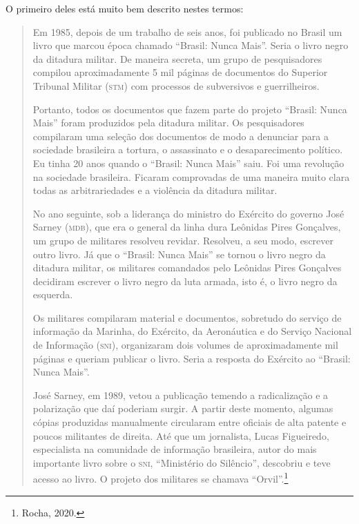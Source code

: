 O primeiro deles está muito bem descrito nestes termos:

\begin{quote}
Em 1985, depois de um trabalho de seis anos, foi publicado no Brasil um
livro que marcou época chamado ``Brasil: Nunca Mais''. Seria o livro
negro da ditadura militar. De maneira secreta, um grupo de pesquisadores
compilou aproximadamente 5 mil páginas de documentos do Superior
Tribunal Militar (\textsc{stm}) com processos de subversivos e guerrilheiros.

Portanto, todos os documentos que fazem parte do projeto ``Brasil: Nunca
Mais'' foram produzidos pela ditadura militar. Os pesquisadores
compilaram uma seleção dos documentos de modo a denunciar para a
sociedade brasileira a tortura, o assassinato e o desaparecimento
político. Eu tinha 20 anos quando o ``Brasil: Nunca Mais'' saiu. Foi uma
revolução na sociedade brasileira. Ficaram comprovadas de uma maneira
muito clara todas as arbitrariedades e a violência da ditadura militar.

No ano seguinte, sob a liderança do ministro do Exército do governo José
Sarney (\textsc{mdb}), que era o general da linha dura Leônidas Pires Gonçalves,
um grupo de militares resolveu revidar. Resolveu, a seu modo, escrever
outro livro. Já que o ``Brasil: Nunca Mais'' se tornou o livro negro da
ditadura militar, os militares comandados pelo Leônidas Pires Gonçalves
decidiram escrever o livro negro da luta armada, isto é, o livro negro
da esquerda.

Os militares compilaram material e documentos, sobretudo do serviço de
informação da Marinha, do Exército, da Aeronáutica e do Serviço Nacional
de Informação (\textsc{sni}), organizaram dois volumes de aproximadamente mil
páginas e queriam publicar o livro. Seria a resposta do Exército ao
``Brasil: Nunca Mais''.

José Sarney, em 1989, vetou a publicação temendo a radicalização e a
polarização que daí poderiam surgir. A partir deste momento, algumas
cópias produzidas manualmente circularam entre oficiais de alta patente
e poucos militantes de direita. Até que um jornalista, Lucas Figueiredo,
especialista na comunidade de informação brasileira, autor do mais
importante livro sobre o \textsc{sni}, ``Ministério do Silêncio'', descobriu e
teve acesso ao livro. O projeto dos militares se chamava
``Orvil''.\footnote{Rocha, 2020.}
\end{quote}

